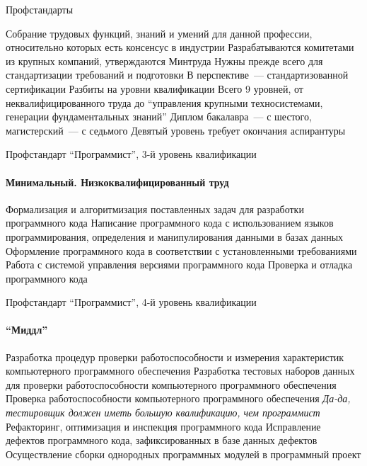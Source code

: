 \documentclass{../../slides-style}
\begin{document}
    \begin{frame}{Профстандарты}
        \begin{outline}
            \1 Собрание трудовых функций, знаний и умений для данной профессии, относительно которых есть консенсус в индустрии
            \1 Разрабатываются комитетами из крупных компаний, утверждаются Минтруда
            \1 Нужны прежде всего для стандартизации требований и подготовки
                \2 В перспективе~--- стандартизованной сертификации
            \1 Разбиты на уровни квалификации
                \2 Всего 9 уровней, от неквалифицированного труда до \enquote{управления крупными техносистемами, генерации фундаментальных знаний}
                \2 Диплом бакалавра~--- с шестого, магистерский~--- с седьмого
                \2 Девятый уровень требует окончания аспирантуры
        \end{outline}
    \end{frame}

    \begin{frame}{Профстандарт \enquote{Программист}, 3-й уровень квалификации}
        \framesubtitle{Минимальный. Низкоквалифицированный труд}
        \begin{outline}
            \1 Формализация и алгоритмизация поставленных задач для разработки программного кода
            \1 Написание программного кода с использованием языков программирования, определения и манипулирования данными в базах данных
            \1 Оформление программного кода в соответствии с установленными требованиями
            \1 Работа с системой управления версиями программного кода
            \1 Проверка и отладка программного кода
        \end{outline}
    \end{frame}

    \begin{frame}{Профстандарт \enquote{Программист}, 4-й уровень квалификации}
        \framesubtitle{\enquote{Миддл}}
        \begin{outline}
            \1 Разработка процедур проверки работоспособности и измерения характеристик компьютерного программного обеспечения
            \1 Разработка тестовых наборов данных для проверки работоспособности компьютерного программного обеспечения
            \1 Проверка работоспособности компьютерного программного обеспечения
                \1 \emph{Да-да, тестировщик должен иметь большую квалификацию, чем программист}
            \1 Рефакторинг, оптимизация и инспекция программного кода
            \1 Исправление дефектов программного кода, зафиксированных в базе данных дефектов
            \1 Осуществление сборки однородных программных модулей в программный проект
        \end{outline}
    \end{frame}
\end{document}
